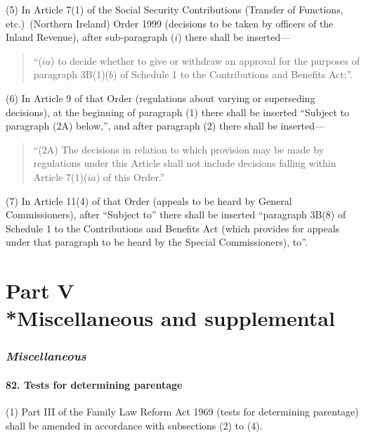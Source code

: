 \documentclass[12pt,a4paper]{article}
\begin{document}
(5) In Article 7(1)  of the Social Security Contributions (Transfer of Functions, etc.)\ (Northern Ireland) Order 1999 (decisions to be taken by officers of the Inland Revenue), after sub-paragraph ($i$)  there shall be inserted—
\begin{quotation}
“($ia$) to decide whether to give or withdraw an approval for the purposes of paragraph 3B(1)($b$)  of Schedule 1 to the Contributions and Benefits Act;”.
\end{quotation}

(6) In Article 9 of that Order (regulations about varying or superseding decisions), at the beginning of paragraph (1)  there shall be inserted “Subject to paragraph (2A)  below,”, and after paragraph (2)  there shall be inserted—
\begin{quotation}
“(2A) The decisions in relation to which provision may be made by regulations under this Article shall not include decisions falling within Article 7(1)($ia$) of this Order.”
\end{quotation}

(7) In Article 11(4)  of that Order (appeals to be heard by General Commissioners), after “Subject to” there shall be inserted “paragraph 3B(8)  of Schedule 1 to the Contributions and Benefits Act (which provides for appeals under that paragraph to be heard by the Special Commissioners), to”.

\part[Part V --- Miscellaneous and supplemental]{Part V\\*Miscellaneous and supplemental}

\renewcommand\parthead{--- Part V}

\section{\itshape Miscellaneous}

\subsection{82. Tests for determining parentage}

(1) Part III of the Family Law Reform Act 1969 (tests for determining parentage) shall be amended in accordance with subsections (2)  to (4).
\end{document}
